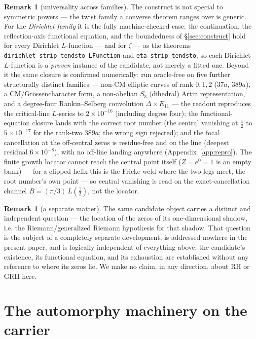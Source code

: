 \documentclass[11pt]{article}
\theoremstyle{definition}
\newtheorem{remark}[theorem]{Remark}
\begin{document}
\begin{remark}[universality across families]
The construct is not special to symmetric powers --- the twist family a converse theorem ranges over
is generic. For the \emph{Dirichlet family} it is the fully machine-checked case: the continuation, the
reflection-axis functional equation, and the boundedness of \S\ref{sec:construct} hold for every
Dirichlet $L$-function --- and for $\zeta$ --- as the theorems
\texttt{dirichlet\_strip\_tendsto\_LFunction} and \texttt{eta\_strip\_tendsto}, so each Dirichlet
$L$-function is a \emph{proven} instance of the candidate, not merely a fitted one. Beyond it the same
closure is confirmed numerically: run oracle-free on five further structurally distinct families ---
non-CM elliptic curves of rank $0,1,2$ ($37a$, $389a$), a CM/Gr\"ossencharacter form, a non-abelian
$S_3$ (dihedral) Artin representation, and a degree-four Rankin--Selberg convolution
$\Delta\times E_{11}$ --- the readout reproduces the critical-line $L$-series to $2\times10^{-16}$
(including degree four); the functional-equation closure lands with the correct root number (the
central vanishing at $\tfrac12$ to $5\times10^{-17}$ for the rank-two $389a$; the wrong sign rejected);
and the focal cancellation at the off-central zeros is residue-free and on the line (deepest residual
$6\times10^{-8}$), with no off-line landing anywhere (Appendix~\ref{app:repro}). The finite growth
locator cannot reach the central point itself ($Z=e^{0}=1$ is an empty bank) --- for a clipped helix
this is the Fricke weld where the two legs meet, the root number's own point --- so central vanishing
is read on the exact-cancellation channel $B=(\pi/3)\,L(\tfrac12)$, not the locator.
\end{remark}

\begin{remark}[a separate matter]
The same candidate object carries a distinct and independent question --- the location of the zeros of
its one-dimensional shadow, i.e. the Riemann/generalized Riemann hypothesis for that shadow. That
question is the subject of a completely separate development, is addressed nowhere in the present
paper, and is logically independent of everything above: the candidate's existence, its functional
equation, and its exhaustion are established without any reference to where its zeros lie. We make no
claim, in any direction, about RH or GRH here.
\end{remark}

\section{The automorphy machinery on the carrier}\label{sec:machinery}
\end{document}

